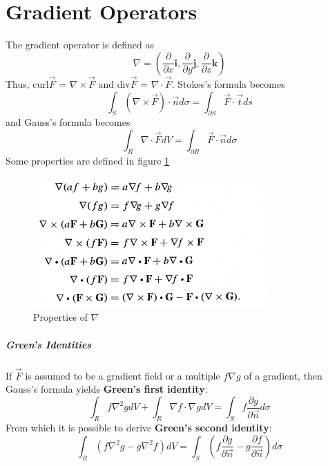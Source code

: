 \documentclass[11pt]{article}
\begin{document}
\section{Gradient Operators}
	The gradient operator is defined as
	\begin{equation}
		\nabla = \left( \frac{\partial}{\partial x} \mathbf{i}, \frac{\partial}{\partial y} \mathbf{j}, \frac{\partial}{\partial z} \mathbf{k} \right)
	\end{equation}
	Thus, curl$\vec{F}$ = $\nabla \times \vec{F}$ and div$\vec{F}$ = $\nabla \cdot \vec{F}$. Stokes's formula becomes
	\begin{equation}
		\int_S (\nabla \times \vec{F})\cdot \vec{n} d\sigma = \int_{\partial S} \vec{F} \cdot \vec{t} ds
	\end{equation}
	and Gauss's formula becomes
	\begin{equation}
		\int_R \nabla \cdot \vec{F} dV = \int_{\partial R} \vec{F} \cdot \vec{n} d\sigma
	\end{equation}
	Some properties are defined in figure \ref{fig:grad}
	
	\begin{figure}[htb]
		\centering
		\includegraphics[width=0.8\textwidth]{gradproperties.jpg}
		\caption{Properties of $\nabla$}
		\label{fig:grad}
	\end{figure}
	
	\subparagraph{Green's Identities} If $\vec{F}$ is assumed to be a gradient field or a multiple $f\nabla g$ of a gradient, then Gauss's formula yields \textbf{Green's first identity}:
		\begin{equation}
			\int_R f\nabla^2 gdV + \int_R \nabla f \cdot \nabla g dV = \int_S f \frac{\partial g}{\partial \vec{n}} d\sigma
		\end{equation}
		From which it is possible to derive \textbf{Green's second identity}:
		\begin{equation}
			\int_R (f\nabla^2 g - g\nabla^2 f)dV = \int_S \left(f \frac{\partial g}{\partial \vec{n}} - g \frac{\partial f}{\partial \vec{n}} \right)d\sigma
		\end{equation}
		
\end{document}
